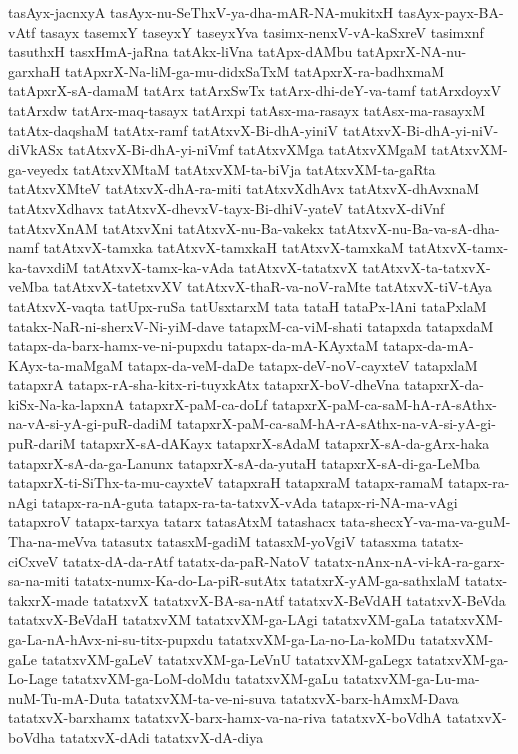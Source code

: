 {tasAyx-jacnxyA
tasAyx-nu-SeThxV-ya-dha-mAR-NA-mukitxH
tasAyx-payx-BA-vAtf
tasayx
tasemxY
taseyxY
taseyxYva
tasimx-nenxV-vA-kaSxreV
tasimxnf
tasuthxH
tasxHmA-jaRna
tatAkx-liVna
tatApx-dAMbu
tatApxrX-NA-nu-garxhaH
tatApxrX-Na-liM-ga-mu-didxSaTxM
tatApxrX-ra-badhxmaM
tatApxrX-sA-damaM
tatArx
tatArxSwTx
tatArx-dhi-deY-va-tamf
tatArxdoyxV
tatArxdw
tatArx-maq-tasayx
tatArxpi
tatAsx-ma-rasayx
tatAsx-ma-rasayxM
tatAtx-daqshaM
tatAtx-ramf
tatAtxvX-Bi-dhA-yiniV
tatAtxvX-Bi-dhA-yi-niV-diVkASx
tatAtxvX-Bi-dhA-yi-niVmf
tatAtxvXMga
tatAtxvXMgaM
tatAtxvXM-ga-veyedx
tatAtxvXMtaM
tatAtxvXM-ta-biVja
tatAtxvXM-ta-gaRta
tatAtxvXMteV
tatAtxvX-dhA-ra-miti
tatAtxvXdhAvx
tatAtxvX-dhAvxnaM
tatAtxvXdhavx
tatAtxvX-dhevxV-tayx-Bi-dhiV-yateV
tatAtxvX-diVnf
tatAtxvXnAM
tatAtxvXni
tatAtxvX-nu-Ba-vakekx
tatAtxvX-nu-Ba-va-sA-dha-namf
tatAtxvX-tamxka
tatAtxvX-tamxkaH
tatAtxvX-tamxkaM
tatAtxvX-tamx-ka-tavxdiM
tatAtxvX-tamx-ka-vAda
tatAtxvX-tatatxvX
tatAtxvX-ta-tatxvX-veMba
tatAtxvX-tatetxvXV
tatAtxvX-thaR-va-noV-raMte
tatAtxvX-tiV-tAya
tatAtxvX-vaqta
tatUpx-ruSa
tatUsxtarxM
tata
tataH
tataPx-lAni
tataPxlaM
tatakx-NaR-ni-sherxV-Ni-yiM-dave
tatapxM-ca-viM-shati
tatapxda
tatapxdaM
tatapx-da-barx-hamx-ve-ni-pupxdu
tatapx-da-mA-KAyxtaM
tatapx-da-mA-KAyx-ta-maMgaM
tatapx-da-veM-daDe
tatapx-deV-noV-cayxteV
tatapxlaM
tatapxrA
tatapx-rA-sha-kitx-ri-tuyxkAtx
tatapxrX-boV-dheVna
tatapxrX-da-kiSx-Na-ka-lapxnA
tatapxrX-paM-ca-doLf
tatapxrX-paM-ca-saM-hA-rA-sAthx-na-vA-si-yA-gi-puR-dadiM
tatapxrX-paM-ca-saM-hA-rA-sAthx-na-vA-si-yA-gi-puR-dariM
tatapxrX-sA-dAKayx
tatapxrX-sAdaM
tatapxrX-sA-da-gArx-haka
tatapxrX-sA-da-ga-Lanunx
tatapxrX-sA-da-yutaH
tatapxrX-sA-di-ga-LeMba
tatapxrX-ti-SiThx-ta-mu-cayxteV
tatapxraH
tatapxraM
tatapx-ramaM
tatapx-ra-nAgi
tatapx-ra-nA-guta
tatapx-ra-ta-tatxvX-vAda
tatapx-ri-NA-ma-vAgi
tatapxroV
tatapx-tarxya
tatarx
tatasAtxM
tatashacx
tata-shecxY-va-ma-va-guM-Tha-na-meVva
tatasutx
tatasxM-gadiM
tatasxM-yoVgiV
tatasxma
tatatx-ciCxveV
tatatx-dA-da-rAtf
tatatx-da-paR-NatoV
tatatx-nAnx-nA-vi-kA-ra-garx-sa-na-miti
tatatx-numx-Ka-do-La-piR-sutAtx
tatatxrX-yAM-ga-sathxlaM
tatatx-takxrX-made
tatatxvX
tatatxvX-BA-sa-nAtf
tatatxvX-BeVdAH
tatatxvX-BeVda
tatatxvX-BeVdaH
tatatxvXM
tatatxvXM-ga-LAgi
tatatxvXM-gaLa
tatatxvXM-ga-La-nA-hAvx-ni-su-titx-pupxdu
tatatxvXM-ga-La-no-La-koMDu
tatatxvXM-gaLe
tatatxvXM-gaLeV
tatatxvXM-ga-LeVnU
tatatxvXM-gaLegx
tatatxvXM-ga-Lo-Lage
tatatxvXM-ga-LoM-doMdu
tatatxvXM-gaLu
tatatxvXM-ga-Lu-ma-nuM-Tu-mA-Duta
tatatxvXM-ta-ve-ni-suva
tatatxvX-barx-hAmxM-Dava
tatatxvX-barxhamx
tatatxvX-barx-hamx-va-na-riva
tatatxvX-boVdhA
tatatxvX-boVdha
tatatxvX-dAdi
tatatxvX-dA-diya
}
